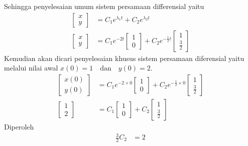 \documentclass{article}
\begin{document}
\begin{enumerate}[label=\alph*.]
    Sehingga penyelesaian umum sistem persamaan differensial yaitu
    \begin{align*}
        \begin{bmatrix}
            x \\ y
        \end{bmatrix} &= C_1e^{\lambda_1t}+C_2e^{\lambda_2t} \\
        \begin{bmatrix}
            x \\ y
        \end{bmatrix} &= C_1e^{-2t} \begin{bmatrix}
            1 \\ 0
        \end{bmatrix} + C_2e^{-\frac{1}{2}t}  \begin{bmatrix}
            1 \\ \frac{3}{2}
        \end{bmatrix}
    \end{align*}
    Kemudian akan dicari penyelesaian khusus sistem persamaan diferensial yaitu melalui nilai awal $x(0) = 1 \quad \text{dan}\quad y(0) = 2$.
    \begin{align*}
        \begin{bmatrix}
            x(0) \\ y(0)
        \end{bmatrix} &= C_1e^{-2 \times0} \begin{bmatrix}
            1 \\ 0
        \end{bmatrix} + C_2e^{-\frac{1}{2}\times 0}  \begin{bmatrix}
            1 \\ \frac{3}{2}
        \end{bmatrix} \\
        \begin{bmatrix}
            1 \\ 2
        \end{bmatrix} &= C_1 \begin{bmatrix}
            1 \\ 0
        \end{bmatrix} + C_2\begin{bmatrix}
            1 \\ \frac{3}{2}
        \end{bmatrix}
    \end{align*}
    Diperoleh
    \begin{align*}
        \frac{3}{2}C_2&=2\\

\end{align*}
\end{enumerate}
\end{document}
